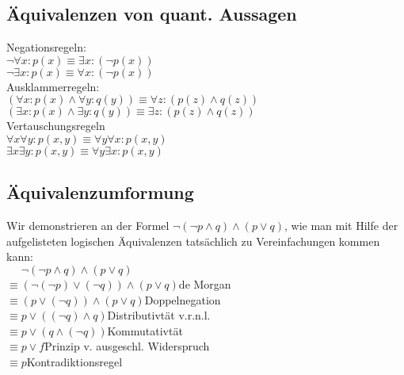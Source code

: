 \subsection*{Äquivalenzen von quant. Aussagen}
Negationsregeln:\\
$\neg\forall x:p(x)\equiv\exists x:(\neg p(x))$\\
$\neg\exists x:p(x)\equiv\forall x:(\neg p(x))$\\
Ausklammerregeln:\\
$(\forall x:p(x)\wedge\forall y:q(y))\equiv\forall z:(p(z)\wedge q(z))$\\
$(\exists x:p(x)\wedge\exists y:q(y))\equiv\exists z:(p(z)\wedge q(z))$\\
Vertauschungsregeln\\
$\forall x\forall y:p(x,y)\equiv\forall y\forall x:p(x,y)$\\
$\exists x\exists y:p(x,y)\equiv\forall y\exists x:p(x,y)$
\subsection*{Äquivalenzumformung}
Wir demonstrieren an der Formel $\neg (\neg p \wedge q) \wedge (p \vee q)$, wie man mit Hilfe der
aufgelisteten logischen Äquivalenzen tatsächlich zu Vereinfachungen kommen kann:\\
$\phantom{{}\equiv{}} \neg (\neg p \wedge q) \wedge (p \vee q)$\\
$\equiv (\neg (\neg p) \vee (\neg q)) \wedge (p \vee q)$\hfill de Morgan\\
$\equiv (p \vee (\neg q)) \wedge (p \vee q)$\hfill Doppelnegation\\
$\equiv p \vee ((\neg q) \wedge q)$\hfill Distributivtät v.r.n.l.\\
$\equiv p \vee (q \wedge (\neg q))$\hfill Kommutativtät\\
$\equiv p \vee f$\hfill Prinzip v. ausgeschl. Widerspruch\\
$\equiv p$\hfill Kontradiktionsregel




